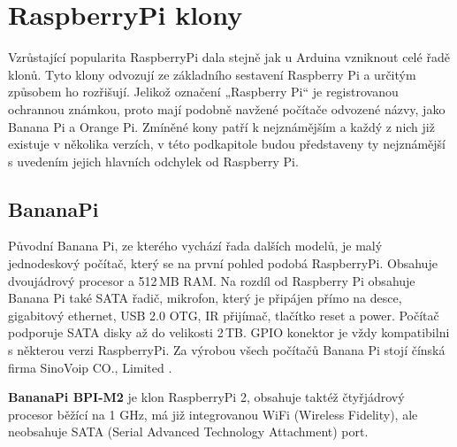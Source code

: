 
\section{RaspberryPi klony}
\label{KapRaspiKlony}

Vzrůstající popularita RaspberryPi dala stejně jak u Arduina vzniknout celé řadě klonů. Tyto klony odvozují ze základního sestavení Raspberry Pi a určitým způsobem ho rozřišují. Jelikož označení „Raspberry Pi“ je registrovanou ochrannou známkou, proto mají podobně navžené počítače odvozené názvy, jako Banana Pi a Orange Pi. Zmíněné kony patří k nejznámějším a každý z nich již existuje v několika verzích, v této podkapitole budou představeny ty nejznámější s uvedením jejich hlavních odchylek od Raspberry Pi.

	\subsection{BananaPi}
		Původní Banana Pi, ze kterého vychází řada dalších modelů, je malý jednodeskový počítač, který se na první pohled podobá RaspberryPi.  Obsahuje dvoujádrový procesor a 512\,MB RAM. Na rozdíl od Raspberry Pi obsahuje Banana Pi také SATA řadič, mikrofon, který je připájen přímo na desce, gigabitový ethernet, USB 2.0 OTG, IR přijímač, tlačítko reset a power. Počítač podporuje SATA disky až do velikosti 2\,TB. GPIO konektor je vždy kompatibilni s některou verzi RaspberryPi. Za výrobou všech počítačů Banana Pi stojí čínská firma SinoVoip CO., Limited \cite{BananaPi}.
		
	\textbf{BananaPi BPI-M2} je klon RaspberryPi 2, obsahuje taktéž čtyřjádrový procesor běžící na 1 GHz, má již integrovanou WiFi (Wireless Fidelity), ale neobsahuje SATA (Serial Advanced Technology Attachment) port.
	

